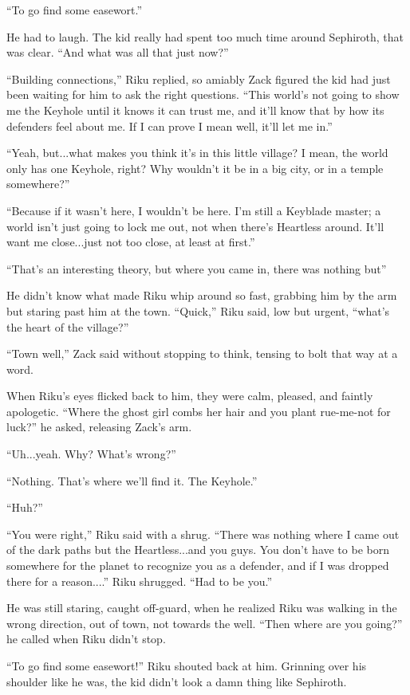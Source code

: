 ``To go find some easewort.''

He had to laugh. The kid really had spent too much time around Sephiroth, that was clear. ``And what was all that just now?''

``Building connections,'' Riku replied, so amiably Zack figured the kid had just been waiting for him to ask the right questions. ``This world's not going to show me the Keyhole until it knows it can trust me, and it'll know that by how its defenders feel about me. If I can prove I mean well, it'll let me in.''

``Yeah, but...what makes you think it's in this little village? I mean, the world only has one Keyhole, right? Why wouldn't it be in a big city, or in a temple somewhere?''

``Because if it wasn't here, I wouldn't be here. I'm still a Keyblade master; a world isn't just going to lock me out, not when there's Heartless around. It'll want me close...just not too close, at least at first.''

``That's an interesting theory, but where you came in, there was nothing but\textemdash ''

He didn't know what made Riku whip around so fast, grabbing him by the arm but staring past him at the town. ``Quick,'' Riku said, low but urgent, ``what's the heart of the village?''

``Town well,'' Zack said without stopping to think, tensing to bolt that way at a word.

When Riku's eyes flicked back to him, they were calm, pleased, and faintly apologetic. ``Where the ghost girl combs her hair and you plant rue-me-not for luck?'' he asked, releasing Zack's arm.

``Uh...yeah. Why? What's wrong?''

``Nothing. That's where we'll find it. The Keyhole.''

``Huh?''

``You were right,'' Riku said with a shrug. ``There was nothing where I came out of the dark paths but the Heartless...and you guys. You don't have to be born somewhere for the planet to recognize you as a defender, and if I was dropped there for a reason....'' Riku shrugged. ``Had to be you.''

He was still staring, caught off-guard, when he realized Riku was walking in the wrong direction, out of town, not towards the well. ``Then where are you going?'' he called when Riku didn't stop.

``To go find some easewort!'' Riku shouted back at him. Grinning over his shoulder like he was, the kid didn't look a damn thing like Sephiroth.


